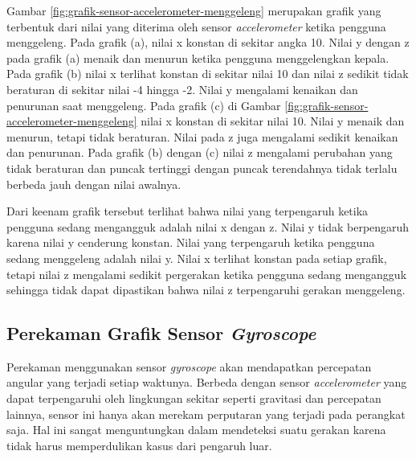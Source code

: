 Gambar \ref{fig:grafik-sensor-accelerometer-menggeleng} merupakan grafik yang terbentuk dari nilai yang diterima oleh sensor \textit{accelerometer} ketika pengguna menggeleng. Pada grafik (a), nilai x konstan di sekitar angka 10. Nilai y dengan z pada grafik (a) menaik dan menurun ketika pengguna menggelengkan kepala. Pada grafik (b) nilai x terlihat konstan di sekitar nilai 10 dan nilai z sedikit tidak beraturan di sekitar nilai -4 hingga -2. Nilai y mengalami kenaikan dan penurunan saat menggeleng. Pada grafik (c) di Gambar \ref{fig:grafik-sensor-accelerometer-menggeleng} nilai x konstan di sekitar nilai 10. Nilai y menaik dan menurun, tetapi tidak beraturan. Nilai pada z juga mengalami sedikit kenaikan dan penurunan. Pada grafik (b) dengan (c) nilai z mengalami perubahan yang tidak beraturan dan puncak tertinggi dengan puncak terendahnya tidak terlalu berbeda jauh dengan nilai awalnya.

Dari keenam grafik tersebut terlihat bahwa nilai yang terpengaruh ketika pengguna sedang mengangguk adalah nilai x dengan z. Nilai y tidak berpengaruh karena nilai y cenderung konstan. Nilai yang terpengaruh ketika pengguna sedang menggeleng adalah nilai y. Nilai x terlihat konstan pada setiap grafik, tetapi nilai z mengalami sedikit pergerakan ketika pengguna sedang mengangguk sehingga tidak dapat dipastikan bahwa nilai z terpengaruhi gerakan menggeleng. 

\subsection{Perekaman Grafik Sensor \textit{Gyroscope}}
\label{sec:analisis_grafik_sensor_gyroscope}
Perekaman menggunakan sensor \textit{gyroscope} akan mendapatkan percepatan angular yang terjadi setiap waktunya. Berbeda dengan sensor \textit{accelerometer} yang dapat terpengaruhi oleh lingkungan sekitar seperti gravitasi dan percepatan lainnya, sensor ini hanya akan merekam perputaran yang terjadi pada perangkat saja. Hal ini sangat menguntungkan dalam mendeteksi suatu gerakan karena tidak harus memperdulikan kasus dari pengaruh luar. 


